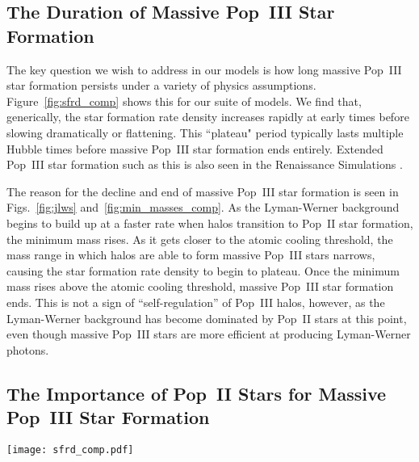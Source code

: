 \documentclass[a4paper,fleqn,usenatbib]{mnras}
\begin{document}
\subsection{The Duration of 
Massive Pop~III Star Formation}
\label{sec:plateau}

The key question we wish to address in our models is how long massive Pop~III star formation persists under a variety of physics assumptions. Figure~\ref{fig:sfrd_comp} shows this for our suite of models. We find that, generically, the star formation rate density increases rapidly at early times before slowing dramatically or flattening. This ``plateau" period typically lasts multiple Hubble times before massive Pop~III star formation ends entirely. Extended Pop~III star formation such as this is also seen in 
the Renaissance Simulations \citep[see][]{xu_2016}.
 
The reason for the decline and end of massive Pop~III star formation is seen in Figs.~\ref{fig:jlws} and~\ref{fig:min_masses_comp}. As the Lyman-Werner background begins to build up at a faster rate 
when halos transition to Pop~II star formation, the minimum mass 
rises. As it gets closer to the atomic cooling threshold, the mass range in which halos are able to form massive Pop~III stars narrows, causing the star formation rate density to begin to plateau. Once the minimum mass rises above the atomic cooling threshold, massive Pop~III star formation ends. This is not a sign of ``self-regulation'' of Pop~III halos, however, as the Lyman-Werner background has become dominated by Pop~II stars at this point,
even though massive Pop~III stars are more efficient at producing Lyman-Werner photons. 

\subsection{The Importance of Pop~II Stars for 
Massive Pop~III Star Formation}

\begin{figure*}
	\texttt{[image: sfrd\_comp.pdf]}
    \caption{Star formation rate density of massive Pop~III stars for a variety of our models. Symbols indicate where Pop~II star formation overtakes Pop~III star formation. The upper panel shows our results for a low mass Pop~III IMF under a variety of different assumptions for the Pop~II and III star formation prescriptions. The bottom panels show a comparison between three different Pop~III IMFs using energy- and momentum-regulated Pop~II star formation, respectively. Note that models which employ momentum-regulated Pop~II star formation will form stars more efficiently in low-mass halos, raising the minimum mass above the atomic cooling threshold faster and cutting Pop~III star formation off sooner.}
    \label{fig:sfrd_comp}
\end{figure*}
\end{document}
